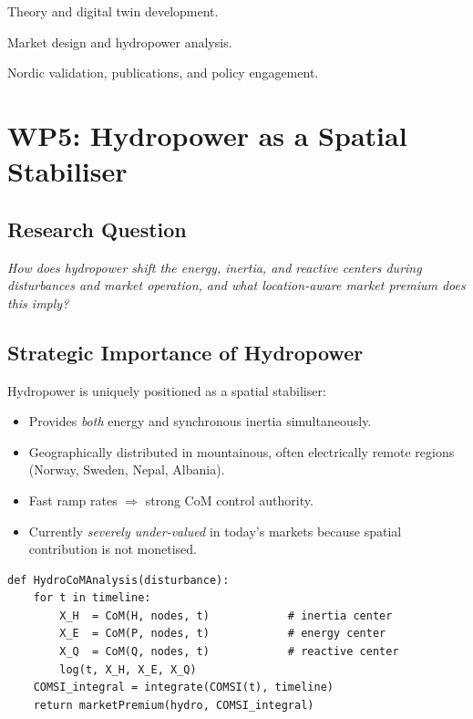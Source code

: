 \documentclass[12pt, a4paper]{article}
\begin{document}
\begin{description}[leftmargin=2em]
  \item[Year 1 (WP1 + WP2)] Theory and digital twin development.
  \item[Year 2 (WP3 + WP5)] Market design and hydropower analysis.
  \item[Year 3 (WP4)] Nordic validation, publications, and policy engagement.
\end{description}

\section{WP5: Hydropower as a Spatial Stabiliser}
\label{sec:hydropower}

\subsection{Research Question}
\textit{How does hydropower shift the energy, inertia, and reactive centers
during disturbances and market operation, and what location-aware market premium
does this imply?}

\subsection{Strategic Importance of Hydropower}
Hydropower is uniquely positioned as a spatial stabiliser:
\begin{itemize}[leftmargin=2em]
  \item Provides \emph{both} energy and synchronous inertia simultaneously.
  \item Geographically distributed in mountainous, often electrically remote
        regions (Norway, Sweden, Nepal, Albania).
  \item Fast ramp rates $\Rightarrow$ strong CoM control authority.
  \item Currently \emph{severely under-valued} in today's markets because spatial
        contribution is not monetised.
\end{itemize}

\begin{lstlisting}[caption={Hydropower CoM shift analysis},
                   label={lst:hydro}]
def HydroCoMAnalysis(disturbance):
    for t in timeline:
        X_H  = CoM(H, nodes, t)            # inertia center
        X_E  = CoM(P, nodes, t)            # energy center
        X_Q  = CoM(Q, nodes, t)            # reactive center
        log(t, X_H, X_E, X_Q)
    COMSI_integral = integrate(COMSI(t), timeline)
    return marketPremium(hydro, COMSI_integral)
\end{lstlisting}
\end{document}
